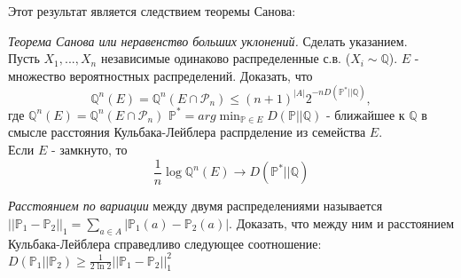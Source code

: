\begin{remark} 
Этот результат является следствием теоремы Санова:
\end{remark}

\begin{problem} \textit{Теорема Санова или неравенство больших уклонений.} Сделать указанием.\\
Пусть $X_1, ..., X_n$ независимые одинаково распределенные с.в. ($X_i \sim \mathbb{Q}$). $E$ - множество вероятностных распределений. Доказать, что
\begin{equation}
\mathbb{Q}^n(E) = \mathbb{Q}^n(E\cap \mathcal{P}_n) \leq (n+1)^{|A|}2^{-nD(\mathbb{P}^*||\mathbb{Q})},
\end{equation}
где $\mathbb{Q}^n(E) = \mathbb{Q}^n(E\cap \mathcal{P}_n)$ $\mathbb{P}^* = arg\min_{\mathbb{P}\in E}D(\mathbb{P}||\mathbb{Q})$ - ближайшее к $\mathbb{Q}$ в смысле расстояния Кульбака-Лейблера  распрделение из семейства $E$.\\
Если $E$ - замкнуто, то
\begin{equation}
\frac{1}{n} \log \mathbb{Q}^n(E) \rightarrow D(\mathbb{P}^*|| \mathbb{Q})
\end{equation}
\end{problem}



\begin{problem} 
\textit{Расстоянием по вариации} между двумя распределениями называется $||\mathbb{P}_1 - \mathbb{P}_2||_1 = \sum_{a \in A} |\mathbb{P}_1(a) - \mathbb{P}_2(a)|$. Доказать, что между ним и расстоянием Кульбака-Лейблера справедливо следующее соотношение:\\
$D(\mathbb{P}_1||\mathbb{P}_2) \geq \frac{1}{2\ln2} ||\mathbb{P}_1 - \mathbb{P}_2||_1^2$
\end{problem}